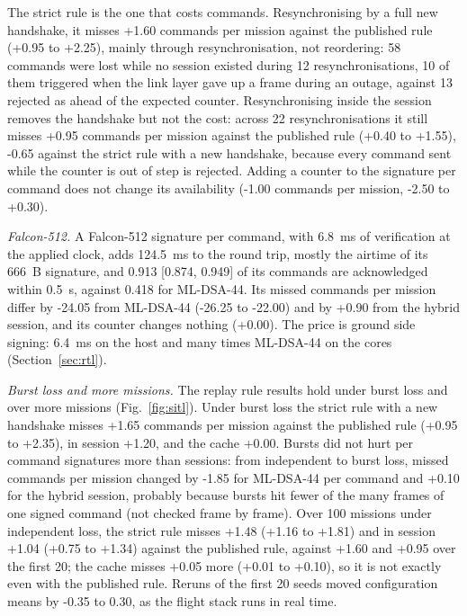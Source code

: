 \documentclass[conference]{IEEEtran}
\begin{document}
The strict rule is the one that costs commands. Resynchronising by a full new handshake, it misses \mbox{+1.60} commands per mission against the published rule (\mbox{+0.95} to \mbox{+2.25}), mainly through resynchronisation, not reordering: 58 commands were lost while no session existed during 12 resynchronisations, 10 of them triggered when the link layer gave up a frame during an outage, against 13 rejected as ahead of the expected counter. Resynchronising inside the session removes the handshake but not the cost: across 22 resynchronisations it still misses \mbox{+0.95} commands per mission against the published rule (\mbox{+0.40} to \mbox{+1.55}), \mbox{-0.65} against the strict rule with a new handshake, because every command sent while the counter is out of step is rejected. Adding a counter to the signature per command does not change its availability (\mbox{-1.00} commands per mission, \mbox{-2.50} to \mbox{+0.30}).

\emph{Falcon-512.} A Falcon-512 signature per command, with 6.8~ms of verification at the applied clock, adds 124.5~ms to the round trip, mostly the airtime of its 666~B signature, and 0.913 [0.874, 0.949] of its commands are acknowledged within 0.5~s, against 0.418 for ML-DSA-44. Its missed commands per mission differ by \mbox{-24.05} from ML-DSA-44 (\mbox{-26.25} to \mbox{-22.00}) and by \mbox{+0.90} from the hybrid session, and its counter changes nothing (\mbox{+0.00}). The price is ground side signing: 6.4~ms on the host and many times ML-DSA-44 on the cores (Section~\ref{sec:rtl}).

\emph{Burst loss and more missions.} The replay rule results hold under burst loss and over more missions (Fig.~\ref{fig:sitl}). Under burst loss the strict rule with a new handshake misses \mbox{+1.65} commands per mission against the published rule (\mbox{+0.95} to \mbox{+2.35}), in session \mbox{+1.20}, and the cache \mbox{+0.00}. Bursts did not hurt per command signatures more than sessions: from independent to burst loss, missed commands per mission changed by \mbox{-1.85} for ML-DSA-44 per command and \mbox{+0.10} for the hybrid session, probably because bursts hit fewer of the many frames of one signed command (not checked frame by frame). Over 100 missions under independent loss, the strict rule misses \mbox{+1.48} (\mbox{+1.16} to \mbox{+1.81}) and in session \mbox{+1.04} (\mbox{+0.75} to \mbox{+1.34}) against the published rule, against \mbox{+1.60} and \mbox{+0.95} over the first 20; the cache misses \mbox{+0.05} more (\mbox{+0.01} to \mbox{+0.10}), so it is not exactly even with the published rule. Reruns of the first 20 seeds moved configuration means by -0.35 to 0.30, as the flight stack runs in real time.
\end{document}
